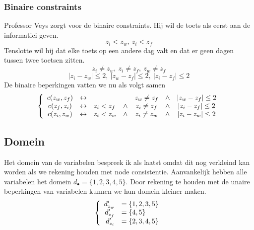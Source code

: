 \documentclass[alternative-exam.tex]{subfiles}
\begin{document}
\subsubsection{Binaire constraints}
Professor Veys zorgt voor de binaire constraints. Hij wil de toets als eerst aan de informatici geven.
\[
z_i < z_w,\ z_i < z_f
\]
Tenslotte wil hij dat elke toets op een andere dag valt en dat er geen dagen tussen twee toetsen zitten.
\[
z_i \neq z_w,\ z_i \neq z_f,\ z_w \neq z_f
\]
\[
|z_i - z_w| \le 2,\ |z_w - z_f| \le 2,\ |z_i - z_f| \le 2
\]
De binaire beperkingen vatten we nu als volgt samen
\[
\left\lbrace
\begin{array}{c l l c c c c}
c(z_w, z_f) & \leftrightarrow && & z_w \neq z_f &\wedge& |z_w - z_f| \le 2\\
c(z_f, z_i) & \leftrightarrow & z_i < z_f &\wedge& z_i \neq z_f &\wedge& |z_i - z_f| \le 2\\
c(z_i, z_w) & \leftrightarrow & z_i < z_w &\wedge& z_i \neq z_w &\wedge& |z_i - z_w| \le 2\\
\end{array}
\right.
\]

\subsection{Domein}
Het domein van de variabelen bespreek ik als laatst omdat dit nog verkleind kan worden als we rekening houden met node consistentie.
Aanvankelijk hebben alle variabelen het domein $d_\bullet = \{1,2,3,4,5\}$. Door rekening te houden met de unaire beperkingen van variabelen kunnen we hun domein kleiner maken.
\[
\left\lbrace
\begin{array}{r l}
d_{z_w}' &= \{1,2,3,5\}\\
d_{z_f}' &= \{4,5\}\\
d_{z_i}' &= \{2,3,4,5\}\\
\end{array}
\right.
\]
\end{document}
